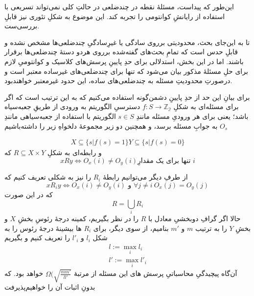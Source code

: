 
این‌طور که پیداست، مسئلهٔ نقطه در چندضلعی در حالتِ کلی نمی‌تواند تسریعی با استفاده از رایانشِ کوانتومی را تجربه کند. این موضوع به شکلِ تئوری نیز قابلِ بررسی‌ست.

تا به این‌جای بحث، محدودیتی برروی سادگی یا غیرِسادگیِ چندضلعی‌ها مشخص نشده و قابلِ حدس است که تمامِ بحث‌های گفته‌شده برروی هردو دستهٔ چندضلعی‌ها برقرار باشند. اما در این بخش، استدلالی برای حدِ پایینِ پرسش‌های کلاسیک و کوانتومیِ لازم برای حلِ مسئلهٔ مذکور بیان می‌شود که تنها برای چندضلعی‌های غیرساده معتبر است و درصورتِ محدودیتِ مسئله به چندضلعی‌های ساده، این حدود غیرمعتبر خواهندبود.

برای بیانِ این حد از حدِ پایینِ دشمن‌گونه استفاده می‌کنیم که به این ترتیب است که اگر برای مسئله‌ای به شکلِ
$f: S \to \mathbb{Z_2}$
دسترسیِ الگوریتم به ورودی از طریقِ جعبه‌سیاه باشد؛ یعنی برای هر ورودیِ مسئله مانندِ $s \in S$ الگوریتم با استفاده از جعبه‌سیاهی مانندِ
$O_s$
به جوابِ مسئله برسد، و همچنین دو زیر مجموعهٔ دلخواهِ زیر را داشته‌باشیم

\begin{eqnarray}
    X \subseteq \{ s | f(s) = 1 \}
    Y \subseteq \{ s | f(s) = 0 \}
\end{eqnarray}
و رابطه‌ای به شکلِ
$R \subseteq X \times Y $
که 
\begin{equation}
    x R y \Leftrightarrow O_x(i) \ne O_y(i) \text{تنها برای یک مقدارِ $i$}
\end{equation}

از طرفِ دیگر می‌توانیم رابطهٔ $R_i$ را نیز به شکلی تعریف کنیم که
\begin{equation}
    x R_i y \Leftrightarrow O_x(i) \ne O_y(i) \text{ و } \forall j \ne i ~ O_x(j) = O_y(j)
\end{equation}
که در این صورت
\begin{equation}
    R = \bigcup_{i} R_i
\end{equation}
حالا اگر گرافِ دوبخشیِ معادل با $R$ را در نظر بگیریم، کمینه درجهٔ رئوسِ بخشِ $X$ و بخشِ $Y$ را به ترتیب 
$m$
و 
$m'$
بنامیم، از سوی دیگر، برای $R_i$ ها بیشینهٔ  درجهٔ رئوس را به شکل $l_i$ و $l'_i$ را تعریف کنیم و بگیریم
\begin{eqnarray}
    l := \max_i l_i \\
    l':= \max_i l'_i
\end{eqnarray}
آن‌گاه پیچیدگیِ محاسباتیِ پرسش های این مسئله از مرتبهٔ
$\Omega(\sqrt{\frac{m m'}{l l'}}$
خواهد بود. که بدونِ اثبات آن را خواهیم‌پذیرفت  



